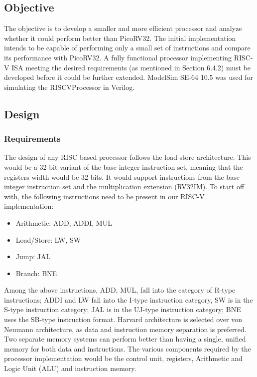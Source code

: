 \subsection{Objective}
\label{sect6_4_1}
The objective is to develop a smaller and more efficient processor and analyze whether it could perform better than PicoRV32. The initial implementation intends to be capable of performing only a small set of instructions and compare its performance with PicoRV32. A fully functional processor implementing RISC-V ISA meeting the desired requirements (as mentioned in Section 6.4.2) must be developed before it could be further extended.\newline\newline
ModelSim SE-64 10.5 was used for simulating the RISCVProcessor in Verilog.
\subsection{Design}
\label{sect6_4_2}
\subsubsection{Requirements}
\label{section:sect6_4_2_1}
The design of any RISC based processor follows the load-store architecture. This would be a 32-bit variant of the base integer instruction set, meaning that the registers width would be 32 bits. It would support instructions from the base integer instruction set and the multiplication extension (RV32IM). To start off with, the following instructions need to be present in our RISC-V implementation:
\begin{itemize}
\item Arithmetic: ADD, ADDI, MUL
\item Load/Store: LW, SW
\item Jump: JAL
\item Branch: BNE
\end{itemize}
Among the above instructions, ADD, MUL, fall into the category of R-type instructions; ADDI and LW fall into the I-type instruction category, SW is in the S-type instruction category; JAL is in the UJ-type instruction category; BNE uses the SB-type instruction format. \newline\newline
Harvard architecture is selected over von Neumann architecture, as data and instruction memory separation is preferred. Two separate memory systems can perform better than having a single, unified memory for both data and instructions. The various components required by the processor implementation would be the control unit, registers, Arithmetic and Logic Unit (ALU) and instruction memory.

